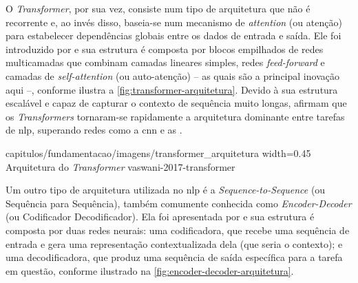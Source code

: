 O \textit{Transformer}, por sua vez, consiste num tipo de arquitetura que não é recorrente e, ao invés disso, baseia-se num mecanismo de \textit{attention} (ou atenção) para estabelecer dependências globais entre os dados de entrada e saída.
Ele foi introduzido por  e sua estrutura é composta por blocos empilhados de redes multicamadas que combinam camadas lineares simples, redes \textit{feed-forward} e camadas de \textit{self-attention} (ou auto-atenção) -- as quais são a principal inovação aqui --, conforme ilustra a \autoref{fig:transformer-arquitetura}.
Devido à sua estrutura escalável e capaz de capturar o contexto de sequência muito longas,  afirmam que os \textit{Transformers} tornaram-se rapidamente a arquitetura dominante entre tarefas de \acrshort{nlp}, superando redes como a \acrfull{cnn} e as .

{capitulos/fundamentacao/imagens/transformer_arquitetura}
{width=0.45\textwidth}
{Arquitetura do \textit{Transformer}}
{vaswani-2017-transformer}




Um outro tipo de arquitetura utilizada no \acrshort{nlp} é a \textit{Sequence-to-Sequence} (ou Sequência para Sequência), também comumente conhecida como \textit{Encoder-Decoder} (ou Codificador Decodificador). Ela foi apresentada por  e sua estrutura é composta por duas redes neurais: uma codificadora, que recebe uma sequência de entrada e gera uma representação contextualizada dela (que seria o contexto); e uma decodificadora, que produz uma sequência de saída específica para a tarefa em questão, conforme ilustrado na \autoref{fig:encoder-decoder-arquitetura}. 

